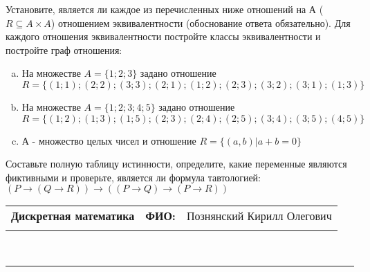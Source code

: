 \documentclass[10pt]{exam}
\newcommand{\class}{Дискретная математика}
\newcommand{\examdate}{}
\begin{document}
\begin{questions}
\question
Установите, является ли каждое из перечисленных ниже отношений на А ($R \subseteq A \times A$) отношением эквивалентности (обоснование ответа обязательно). Для каждого отношения эквивалентности постройте классы 
эквивалентности и постройте граф отношения:
\begin{enumerate} [a)]\setcounter{enumi}{0}
\item На множестве $A = \{1; 2; 3\}$ задано отношение $R = \{(1; 1); (2; 2); (3; 3); (2; 1); (1; 2); (2; 3); (3; 2); (3; 1); (1; 3)\}$
\item На множестве $A = \{1; 2; 3; 4; 5\}$ задано отношение $R = \{(1; 2); (1; 3); (1; 5); (2; 3); (2; 4); (2; 5); (3; 4); (3; 5); (4; 5)\}$
\item А - множество целых чисел и отношение $R = \{(a,b)|a + b = 0\}$
\end{enumerate}\question Составьте полную таблицу истинности, определите, какие переменные являются фиктивными и проверьте, является ли формула тавтологией:
$(P \rightarrow (Q \rightarrow R)) \rightarrow ((P \rightarrow Q) \rightarrow (P \rightarrow R))$

\end{questions}
\newpage
\begin{flushright}
\begin{tabular}{p{2.8in} r l}
\textbf{\class} & \textbf{ФИО:} &Познянский Кирилл Олегович
\\

\textbf{\examdate} &&\\
\end{tabular}\\
\end{flushright}
\rule[1ex]{\textwidth}{.1pt}
\end{document}
